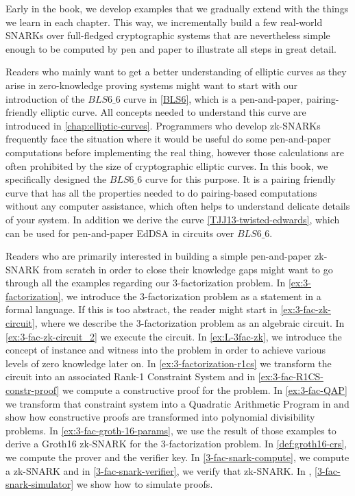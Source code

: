 Early in the book, we develop examples that we gradually extend with the things we learn in each chapter. This way, we incrementally build a few real-world SNARKs over full-fledged cryptographic systems that are nevertheless simple enough to be computed by pen and paper to illustrate all steps in great detail.

Readers who mainly want to get a better understanding of elliptic curves as they arise in zero-knowledge proving systems might want to start with our introduction of the $BLS6\_6$ curve in \secname{} \ref{BLS6}, which is a pen-and-paper, pairing-friendly elliptic curve. All concepts needed to understand this curve are introduced in \chaptname{} \ref{chap:elliptic-curves}. Programmers who develop zk-SNARKs frequently face the situation where it would be useful do some pen-and-paper computations before implementing the real thing, however those calculations are often prohibited by the size of cryptographic elliptic curves. In this book, we specifically designed the $BLS6\_6$ curve for this purpose. It is a pairing friendly curve that has all the properties needed to do pairing-based computations without any computer assistance, which often helps to understand delicate details of your system. In addition we derive the  curve \ref{TJJ13-twisted-edwards}, which can be used for pen-and-paper EdDSA in circuits over $BLS6\_6$. 


Readers who are primarily interested in building a simple pen-and-paper zk-SNARK from scratch in order to close their knowledge gaps might want to go through all the examples regarding our 3-factorization problem. In \examplename{} \ref{ex:3-factorization}, we introduce the 3-factorization problem as a statement in a formal language. If this is too abstract, the reader might start in \examplename{} \ref{ex:3-fac-zk-circuit}, where we describe the 3-factorization problem as an algebraic circuit. In \examplename{} \ref{ex:3-fac-zk-circuit_2} we execute the circuit. In \examplename{} \ref{ex:L-3fac-zk}, we introduce the concept of instance and witness into the problem in order to achieve various levels of zero knowledge later on. In \examplename{} \ref{ex:3-factorization-r1cs} we transform the circuit into an associated Rank-1 Constraint System and in \examplename{} \ref{ex:3-fac-R1CS-constr-proof} we compute a constructive proof for the problem. In \examplename{} \ref{ex:3-fac-QAP} we transform that constraint system into a Quadratic Arithmetic Program in and show how constructive proofs are transformed into polynomial divisibility problems. In \examplename{} \ref{ex:3-fac-groth-16-params}, we  use the result of those examples to derive a Groth16 zk-SNARK for the 3-factorization problem. In \ref{def:groth16-crs}, we compute the prover and the verifier key. In \examplename{} \ref{3-fac-snark-compute}, we compute a zk-SNARK and in \examplename{} \ref{3-fac-snark-verifier}, we verify that zk-SNARK. In \examplename{}, \ref{3-fac-snark-simulator} we show how to simulate proofs. 

